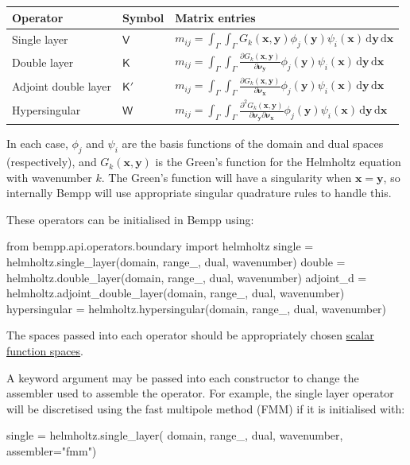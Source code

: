 \documentclass[a4paper]{book}
\begin{document}
\begin{center}
\begin{tabular}{|l|l|l|}
\hline
Operator             & Symbol        & Matrix entries\\
\hline
Single layer         & $\mathsf{V}$  & $\displaystyle m_{ij}=\int_{\Gamma}\int_{\Gamma}G_k(\mathbf{x},\mathbf{y})\phi_j(\mathbf{y})\psi_i(\mathbf{x})\,\mathrm{d}\mathbf{y}\,\mathrm{d}\mathbf{x}$\\
Double layer         & $\mathsf{K}$  & $\displaystyle m_{ij}=\int_{\Gamma}\int_{\Gamma}\frac{\partial G_k(\mathbf{x},\mathbf{y})}{\partial\mathbf{\nu}_{\mathbf{y}}}\phi_j(\mathbf{y})\psi_i(\mathbf{x})\,\mathrm{d}\mathbf{y}\,\mathrm{d}\mathbf{x}$\\
Adjoint double layer & $\mathsf{K}'$ & $\displaystyle m_{ij}=\int_{\Gamma}\int_{\Gamma}\frac{\partial G_k(\mathbf{x},\mathbf{y})}{\partial\mathbf{\nu}_{\mathbf{x}}}\phi_j(\mathbf{y})\psi_i(\mathbf{x})\,\mathrm{d}\mathbf{y}\,\mathrm{d}\mathbf{x}$\\
Hypersingular        & $\mathsf{W}$  & $\displaystyle m_{ij}=\int_{\Gamma}\int_{\Gamma}\frac{\partial^2 G_k(\mathbf{x},\mathbf{y})}{\partial\mathbf{\nu}_{\mathbf{y}}\partial\mathbf{\nu}_{\mathbf{x}}}\phi_j(\mathbf{y})\psi_i(\mathbf{x})\,\mathrm{d}\mathbf{y}\,\mathrm{d}\mathbf{x}$\\
\hline
\end{tabular}
\end{center}
In each case,  $\phi_j$ and $\psi_i$ are the basis functions of the domain and dual spaces (respectively),
and $G_k(\mathbf{x},\mathbf{y})$ is the Green's function for the Helmholtz equation with
wavenumber $k$.
The Green's function will have a singularity when $\mathbf{x}=\mathbf{y}$, so internally Bempp will
use appropriate singular quadrature rules to handle this.

These operators can be initialised in Bempp using:
\begin{python}
from bempp.api.operators.boundary import helmholtz
single = helmholtz.single_layer(domain, range_, dual, wavenumber)
double = helmholtz.double_layer(domain, range_, dual, wavenumber)
adjoint_d = helmholtz.adjoint_double_layer(domain, range_, dual, wavenumber)
hypersingular = helmholtz.hypersingular(domain, range_, dual, wavenumber)
\end{python}
The spaces passed into each operator should be appropriately chosen
\href{scalar_function_spaces.md}{scalar function spaces}.

A keyword argument  may be passed into each constructor to change the assembler
used to assemble the operator. For example, the single layer operator will be discretised using
the fast multipole method (FMM) if it is initialised with:
\begin{python}
single = helmholtz.single_layer(
    domain, range_, dual, wavenumber, assembler="fmm")
\end{python}
\end{document}
